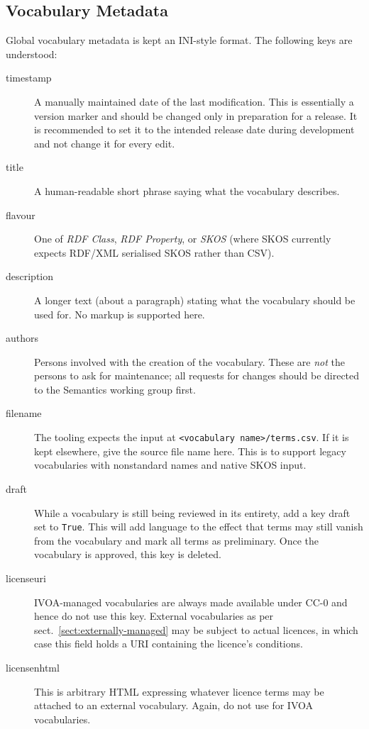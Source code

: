\documentclass[11pt,a4paper]{ivoa}
\def\vocterm#1{\emph{\color{termcolor}#1}}
\def\vocterm{\startvocterm\realvocterm}
\def\realvocterm#1{\emph{\color{termcolor}#1}\endvocterm}
\gdef\breakablecolon{:\hskip0pt}
\gdef\startvocterm{\begingroup
  \catcode`\:=\active\let:=\breakablecolon}
\gdef\endvocterm{\endgroup}
\begin{document}

\subsection{Vocabulary Metadata}
\label{sect:vocmeta}

Global vocabulary metadata is kept an INI-style format.  The following
keys are understood:

\begin{description}
\item[timestamp]
  A manually maintained date of the last modification.  This is
  essentially a version marker and should be changed only in preparation
  for a release.  It is recommended to set it to the intended release
  date during development and not change it for every edit.
\item[title]
  A human-readable short phrase saying what the vocabulary describes.
\item[flavour]
  One of \textit{RDF Class}, \textit{RDF Property}, or \textit{SKOS}
  (where SKOS currently expects RDF/XML serialised SKOS rather than CSV).
\item[description]
  A longer text (about a paragraph) stating what the vocabulary should
  be used for.  No markup is supported here.
\item[authors]
  Persons involved with the creation of the vocabulary.  These are \emph{not}
  the persons to ask for maintenance; all requests for changes should be
  directed to the Semantics working group first.
\item[filename]
  The tooling expects the input at
  \verb|<vocabulary name>/terms.csv|.  If it is kept elsewhere, give
  the source file name here.  This is to support legacy
  vocabularies with nonstandard names and native SKOS input.
\item[draft]
  While a vocabulary is still being reviewed in its entirety, add a key
  draft set to \texttt{True}.  This will add language to the effect that
  terms may still vanish from the vocabulary and mark all terms as
  preliminary.  Once the vocabulary is approved, this key is deleted.
\item[licenseuri]
  IVOA-managed vocabularies are always made available under CC-0 and
  hence do not use this key.  External vocabularies as per
  sect.~\ref{sect:externally-managed} may be subject to actual licences,
  in which case this field holds a URI containing the licence's
  conditions.
\item[licensenhtml]
  This is arbitrary HTML expressing whatever licence terms may be
  attached to an external vocabulary.  Again, do not use for IVOA
  vocabularies.
\end{description}
\end{document}
